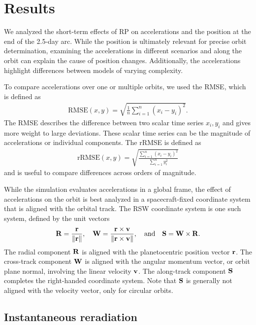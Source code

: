 \section{Results}

We analyzed the short-term effects of \gls{RP} on accelerations and the position at the end of the 2.5-day arc. While the position is ultimately relevant for precise orbit determination, examining the accelerations in different scenarios and along the orbit can explain the cause of position changes. Additionally, the accelerations highlight differences between models of varying complexity.

To compare accelerations over one or multiple orbits, we used the \gls{RMSE}, which is defined as
\begin{align}
    \text{RMSE}(x, y) = \sqrt{\frac{1}{n}\sum_{i=1}^{n}\left(x_i - y_i\right)^2}.
\end{align}
The \gls{RMSE} describes the difference between two scalar time series $x_i, y_i$ and gives more weight to large deviations. These scalar time series can be the magnitude of accelerations or individual components. The \gls{rRMSE} is defined as
\begin{align}
    \text{rRMSE}(x, y) = \sqrt{\frac{\sum_{i=1}^{n}\left(x_i - y_i\right)^2}{\sum_{i=1}^{n} y_i^2}}
\end{align}
and is useful to compare differences across orders of magnitude.

While the simulation evaluates accelerations in a global frame, the effect of accelerations on the orbit is best analyzed in a spacecraft-fixed coordinate system that is aligned with the orbital track. The RSW coordinate system is one such system, defined by the unit vectors~\cite{Vallado2013}
\begin{align}
    \vb R = \frac{\vb r}{\norm{\vb r}}, \quad
    \vb W = \frac{\vb r \times \vb v}{\norm{\vb r \times \vb v}},
    \quad \textrm{and} \quad \vb S = \vb W \times \vb R.
\end{align}
The radial component $\vb R$ is aligned with the planetocentric position vector $\vb r$. The cross-track component $\vb W$ is aligned with the angular momentum vector, or orbit plane normal, involving the linear velocity $\vb v$. The along-track component $\vb S$ completes the right-handed coordinate system. Note that $\vb S$ is generally not aligned with the velocity vector, only for circular orbits.





\subsection{Instantaneous reradiation}
\label{subsec:inst-rerad}

